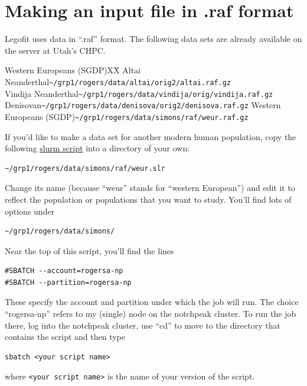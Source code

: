 \documentclass[11pt]{article}
\newenvironment{leftindent}%
{\begin{list}{}%
         {\setlength{\leftmargin}{2em}}%
         \item[]%
}{\end{list}}
\begin{document}
\section{Making an input file in .raf format}
\label{sec.raf}
Legofit uses data in ``.raf'' format. The following data sets are
already available on the server at Utah's CHPC.
\begin{leftindent}
\begin{tabbing}
Western Europeans (SGDP)XX\=\kill    
Altai Neanderthal\>\verb|~/grp1/rogers/data/altai/orig2/altai.raf.gz|\\
Vindija Neanderthal\>\verb|~/grp1/rogers/data/vindija/orig/vindija.raf.gz|\\
Denisovan\>\verb|~/grp1/rogers/data/denisova/orig2/denisova.raf.gz|\kill
Western Europeans (SGDP)\>\verb|~/grp1/rogers/data/simons/raf/weur.raf.gz|
\end{tabbing}
\end{leftindent}
If you'd like to make a data set for another modern human population,
copy the following
\href{https://alanrogers.github.io/agar22/docs/legofit/weur.slr.html}{slurm
  script} into a directory of your own:
\begin{verbatim}
~/grp1/rogers/data/simons/raf/weur.slr
\end{verbatim}
Change its name (because ``weur'' stands for ``western European'') and
edit it to reflect the population or populations that you want to
study. You'll find lots of options under
\begin{verbatim}
~/grp1/rogers/data/simons/
\end{verbatim}
Near the top of this script, you'll find the lines
\begin{verbatim}
#SBATCH --account=rogersa-np
#SBATCH --partition=rogersa-np
\end{verbatim}
These specify the account and partition under which the job will
run. The choice ``rogersa-np'' refers to my (single) node on the
notchpeak cluster. To run the job there, log into the notchpeak
cluster, use ``cd'' to move to the directory that contains the script
and then type
\begin{verbatim}
sbatch <your script name>
\end{verbatim}
where \verb|<your script name>| is the name of your version of the
script.
\end{document}
